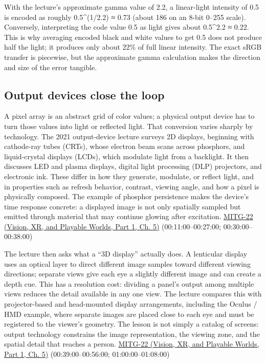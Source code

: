 With the lecture's approximate gamma value of 2.2, a linear-light intensity of 0.5 is encoded as roughly 0.5\^{}(1/2.2) ≈ 0.73 (about 186 on an 8-bit 0--255 scale). Conversely, interpreting the code value 0.5 as light gives about 0.5\^{}2.2 ≈ 0.22. This is why averaging encoded black and white values to get 0.5 does not produce half the light; it produces only about 22\% of full linear intensity. The exact sRGB transfer is piecewise, but the approximate gamma calculation makes the direction and size of the error tangible.

\subsection{Output devices close the loop}\label{03-visual-computing-i-ch004-output-devices-close-the-loop}

\hypertarget{03-visual-computing-i-ch004-output-devices-close-the-loop}{}

A pixel array is an abstract grid of color values; a physical output device has to turn those values into light or reflected light. That conversion varies sharply by technology. The 2021 output-device lecture surveys 2D displays, beginning with cathode-ray tubes (CRTs), whose electron beam scans across phosphors, and liquid-crystal displays (LCDs), which modulate light from a backlight. It then discusses LED and plasma displays, digital light processing (DLP) projectors, and electronic ink. These differ in how they generate, modulate, or reflect light, and in properties such as refresh behavior, contrast, viewing angle, and how a pixel is physically composed. The example of phosphor persistence makes the device's time response concrete: a displayed image is not only spatially sampled but emitted through material that may continue glowing after excitation. \href{../07-Vision-XR-and-Playable-Worlds-P01/main.pdf\#nameddest=04-visual-computing-ii-ch036-mitg-22---output-devices}{MITG-22 (Vision, XR, and Playable Worlds, Part 1, Ch. 5)} (00:11:00--00:27:00; 00:30:00--00:38:00)

The lecture then asks what a ``3D display'' actually does. A lenticular display uses an optical layer to direct different image samples toward different viewing directions; separate views give each eye a slightly different image and can create a depth cue. This has a resolution cost: dividing a panel's output among multiple views reduces the detail available in any one view. The lecture compares this with projector-based and head-mounted display arrangements, including the Oculus / HMD example, where separate images are placed close to each eye and must be registered to the viewer's geometry. The lesson is not simply a catalog of screens: output technology constrains the image representation, the viewing zone, and the spatial detail that reaches a person. \href{../07-Vision-XR-and-Playable-Worlds-P01/main.pdf\#nameddest=04-visual-computing-ii-ch036-mitg-22---output-devices}{MITG-22 (Vision, XR, and Playable Worlds, Part 1, Ch. 5)} (00:39:00--00:56:00; 01:00:00--01:08:00)

